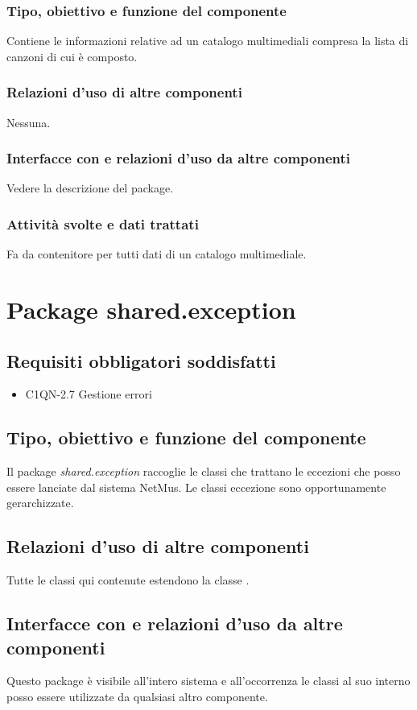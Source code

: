 \subsubsection*{Tipo, obiettivo e funzione del componente}
Contiene le informazioni relative ad un catalogo multimediali compresa la lista
di canzoni di cui \`e composto. 
\subsubsection*{Relazioni d'uso di altre componenti} 
Nessuna.
\subsubsection*{Interfacce con e relazioni d'uso da altre componenti}
Vedere la descrizione del package.
\subsubsection*{Attivit\`a svolte e dati trattati}
Fa da contenitore per tutti dati di un catalogo multimediale.

\newpage
\section{Package shared.exception}
\subsection*{Requisiti obbligatori soddisfatti}
\begin{itemize}
	\item C1QN-2.7 Gestione errori
\end{itemize}
\subsection*{Tipo, obiettivo e funzione del componente}
Il package \emph{shared.exception} raccoglie le classi che trattano
le eccezioni che posso essere lanciate dal sistema NetMus. Le classi eccezione
sono opportunamente gerarchizzate. 
\subsection*{Relazioni d'uso di altre componenti}
Tutte le classi qui contenute estendono la classe .
\subsection*{Interfacce con e relazioni d'uso da altre componenti}
Questo package \`e visibile all'intero sistema e all'occorrenza le classi al suo
interno posso essere utilizzate da qualsiasi altro componente.

